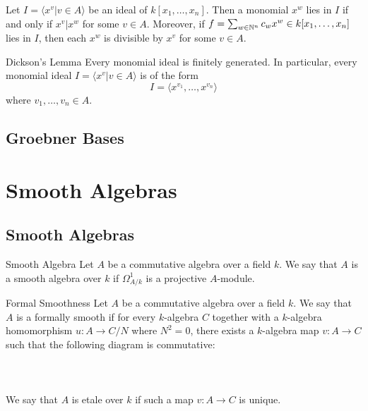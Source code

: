 \documentclass[a4paper]{article}
\begin{document}
\begin{lmm}{}{} Let $I=\langle x^v|v\in A\rangle$ be an ideal of $k[x_1,\dots,x_n]$. Then a monomial $x^w$ lies in $I$ if and only if $x^v|x^w$ for some $v\in A$. Moreover, if $f=\sum_{w\in\mathbb{N}^n}c_wx^w\in k[x_1,\dots,x_n]$ lies in $I$, then each $x^w$ is divisible by $x^v$ for some $v\in A$. 
\end{lmm}

\begin{thm}{Dickson's Lemma}{} Every monomial ideal is finitely generated. In particular, every monomial ideal $I=\langle x^v|v\in A\rangle$ is of the form $$I=\langle x^{v_1},\dots,x^{v_n}\rangle$$ where $v_1,\dots,v_n\in A$. 
\end{thm}

\subsection{Groebner Bases}

\pagebreak
\section{Smooth Algebras}
\subsection{Smooth Algebras}
\begin{defn}{Smooth Algebra}{} Let $A$ be a commutative algebra over a field $k$. We say that $A$ is a smooth algebra over $k$ if $\Omega_{A/k}^1$ is a projective $A$-module. 
\end{defn}

\begin{defn}{Formal Smoothness}{} Let $A$ be a commutative algebra over a field $k$. We say that $A$ is a formally smooth if for every $k$-algebra $C$ together with a $k$-algebra homomorphism $u:A\to C/N$ where $N^2=0$, there exists a $k$-algebra map $v:A\to C$ such that the following diagram is commutative:  \\~\\
\\~\\
We say that $A$ is etale over $k$ if such a map $v:A\to C$ is unique. 
\end{defn}
\end{document}
